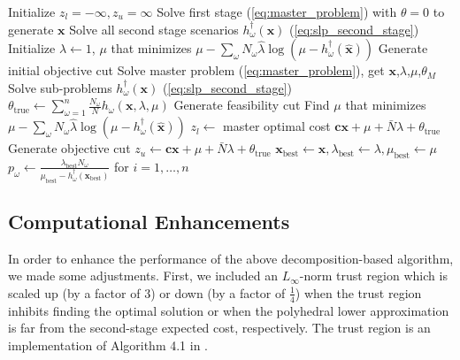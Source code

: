 \documentclass[11pt]{article}
\newcommand{\x}{\mathbf{x}}
\newcommand{\xh}{\hat{\x}}
\newcommand{\lh}{\hat{\lambda}}
\renewcommand{\c}{\mathbf{c}}
\newcommand{\plp}{$\phi$LP-2}
\begin{document}
	\begin{algorithmic}
		\State Initialize $z_l = -\infty, z_u = \infty$
		\State Solve first stage (\ref{eq:master_problem}) with $\theta = 0$  to generate $\x$
		\State Solve all second stage scenarios $h^\dagger_\omega(\x)$ (\ref{eq:slp_second_stage})
		\State Initialize $\lambda \gets 1$, $\mu$ that minimizes $\mu - \sum_\omega N_\omega \lh \log(\mu - h^\dagger_\omega(\xh))$
		\State Generate initial objective cut
			\State Solve master problem (\ref{eq:master_problem}), get $\x$,$\lambda$,$\mu$,$\theta_M$
			\State Solve sub-problems $h^\dagger_\omega(\x)$ (\ref{eq:slp_second_stage})
			\State $\theta_{\text{true}} \gets \sum_{\omega=1}^n \frac{N_\omega}{N} h_\omega(\x,\lambda,\mu)$
			\If{$\mu < \max_\omega h^\dagger_\omega(\x)$}
				\State Generate feasibility cut
				\State Find $\mu$ that minimizes $\mu - \sum_\omega N_\omega \lh \log(\mu - h^\dagger_\omega(\xh))$
			\Else
				\State $z_l \gets$ master optimal cost $\c\x + \mu + \bar{N}\lambda + \theta_{\text{true}}$
			\EndIf
			\State Generate objective cut
			\If{$\c\x + \mu + \bar{N}\lambda + \theta_{\text{true}} < z_u$}
				\State $z_u \gets \c\x + \mu + \bar{N}\lambda + \theta_{\text{true}}$
				\State $\x_\text{best} \gets \x, \lambda_\text{best} \gets \lambda, \mu_\text{best} \gets \mu$
				\State $p_\omega \gets \frac{\lambda_\text{best} N_\omega}{\mu_\text{best} - h^\dagger_\omega(\x_\text{best})}$ for $i = 1, \dots, n$
			\EndIf
		\EndWhile
	\end{algorithmic}

\subsection{Computational Enhancements}

In order to enhance the performance of the above decomposition-based algorithm, we made some adjustments.
First, we included an $L_\infty$-norm trust region which is scaled up (by a factor of $3$) or down (by a factor of $\tfrac{1}{4}$) when the trust region inhibits finding the optimal solution or when the polyhedral lower approximation is far from the second-stage expected cost, respectively.
The trust region is an implementation of Algorithm 4.1 in \cite{nocedal1999numerical}.
\end{document}

